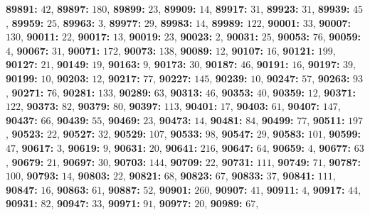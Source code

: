 \textsf{\bfseries 89891:} $42$, \textsf{\bfseries 89897:} $180$, \textsf{\bfseries 89899:} $23$, \textsf{\bfseries 89909:} $14$, \textsf{\bfseries 89917:} $31$, \textsf{\bfseries 89923:} $31$, \textsf{\bfseries 89939:} $45$, \textsf{\bfseries 89959:} $25$, \textsf{\bfseries 89963:} $3$, \textsf{\bfseries 89977:} $29$, \textsf{\bfseries 89983:} $14$, \textsf{\bfseries 89989:} $122$, \textsf{\bfseries 90001:} $33$, \textsf{\bfseries 90007:} $130$, \textsf{\bfseries 90011:} $22$, \textsf{\bfseries 90017:} $13$, \textsf{\bfseries 90019:} $23$, \textsf{\bfseries 90023:} $2$, \textsf{\bfseries 90031:} $25$, \textsf{\bfseries 90053:} $76$, \textsf{\bfseries 90059:} $4$, \textsf{\bfseries 90067:} $31$, \textsf{\bfseries 90071:} $172$, \textsf{\bfseries 90073:} $138$, \textsf{\bfseries 90089:} $12$, \textsf{\bfseries 90107:} $16$, \textsf{\bfseries 90121:} $199$, \textsf{\bfseries 90127:} $21$, \textsf{\bfseries 90149:} $19$, \textsf{\bfseries 90163:} $9$, \textsf{\bfseries 90173:} $30$, \textsf{\bfseries 90187:} $46$, \textsf{\bfseries 90191:} $16$, \textsf{\bfseries 90197:} $39$, \textsf{\bfseries 90199:} $10$, \textsf{\bfseries 90203:} $12$, \textsf{\bfseries 90217:} $77$, \textsf{\bfseries 90227:} $145$, \textsf{\bfseries 90239:} $10$, \textsf{\bfseries 90247:} $57$, \textsf{\bfseries 90263:} $93$, \textsf{\bfseries 90271:} $76$, \textsf{\bfseries 90281:} $133$, \textsf{\bfseries 90289:} $63$, \textsf{\bfseries 90313:} $46$, \textsf{\bfseries 90353:} $40$, \textsf{\bfseries 90359:} $12$, \textsf{\bfseries 90371:} $122$, \textsf{\bfseries 90373:} $82$, \textsf{\bfseries 90379:} $80$, \textsf{\bfseries 90397:} $113$, \textsf{\bfseries 90401:} $17$, \textsf{\bfseries 90403:} $61$, \textsf{\bfseries 90407:} $147$, \textsf{\bfseries 90437:} $66$, \textsf{\bfseries 90439:} $55$, \textsf{\bfseries 90469:} $23$, \textsf{\bfseries 90473:} $14$, \textsf{\bfseries 90481:} $84$, \textsf{\bfseries 90499:} $77$, \textsf{\bfseries 90511:} $197$, \textsf{\bfseries 90523:} $22$, \textsf{\bfseries 90527:} $32$, \textsf{\bfseries 90529:} $107$, \textsf{\bfseries 90533:} $98$, \textsf{\bfseries 90547:} $29$, \textsf{\bfseries 90583:} $101$, \textsf{\bfseries 90599:} $47$, \textsf{\bfseries 90617:} $3$, \textsf{\bfseries 90619:} $9$, \textsf{\bfseries 90631:} $20$, \textsf{\bfseries 90641:} $216$, \textsf{\bfseries 90647:} $64$, \textsf{\bfseries 90659:} $4$, \textsf{\bfseries 90677:} $63$, \textsf{\bfseries 90679:} $21$, \textsf{\bfseries 90697:} $30$, \textsf{\bfseries 90703:} $144$, \textsf{\bfseries 90709:} $22$, \textsf{\bfseries 90731:} $111$, \textsf{\bfseries 90749:} $71$, \textsf{\bfseries 90787:} $100$, \textsf{\bfseries 90793:} $14$, \textsf{\bfseries 90803:} $22$, \textsf{\bfseries 90821:} $68$, \textsf{\bfseries 90823:} $67$, \textsf{\bfseries 90833:} $37$, \textsf{\bfseries 90841:} $111$, \textsf{\bfseries 90847:} $16$, \textsf{\bfseries 90863:} $61$, \textsf{\bfseries 90887:} $52$, \textsf{\bfseries 90901:} $260$, \textsf{\bfseries 90907:} $41$, \textsf{\bfseries 90911:} $4$, \textsf{\bfseries 90917:} $44$, \textsf{\bfseries 90931:} $82$, \textsf{\bfseries 90947:} $33$, \textsf{\bfseries 90971:} $91$, \textsf{\bfseries 90977:} $20$, \textsf{\bfseries 90989:} $67$, 
